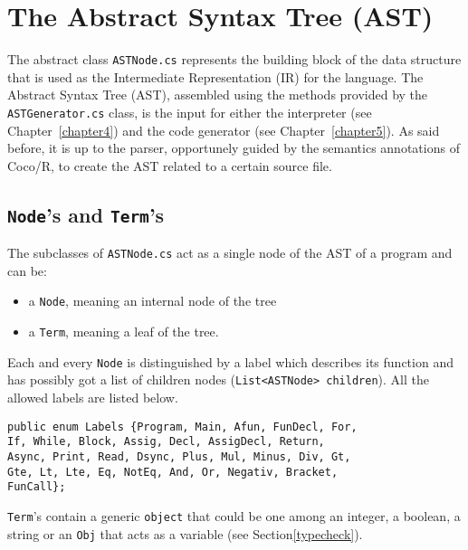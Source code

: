 \chapter{\label{chapter3} The Abstract Syntax Tree (AST)}

The abstract class \texttt{ASTNode.cs} represents the building block of the data structure that is used as the Intermediate Representation (IR) for the \fwap language. The Abstract Syntax Tree (AST), assembled using the methods provided by the \texttt{ASTGenerator.cs} class, is the input for either the interpreter (see Chapter~\ref{chapter4}) and the \fsharp code generator (see Chapter~\ref{chapter5}). As said before, it is up to the parser, opportunely guided by the semantics annotations of Coco/R, to create the AST related to a certain \fwap source file.

\section{\texttt{Node}'s and \texttt{Term}'s}

The subclasses of \texttt{ASTNode.cs} act as a single node of the AST of a program and can be:
\begin{itemize}
	\item a \texttt{Node}, meaning an internal node of the tree 
	\item a \texttt{Term}, meaning a leaf of the tree.
\end{itemize}

Each and every \texttt{Node} is distinguished by a label which describes its function and has possibly got a list of children nodes (\texttt{List<ASTNode> children}). All the allowed labels are listed below.\\

\begin{lstlisting}[caption=Labels for \texttt{Node}'s.]
public enum Labels {Program, Main, Afun, FunDecl, For,
If, While, Block, Assig, Decl, AssigDecl, Return, 
Async, Print, Read, Dsync, Plus, Mul, Minus, Div, Gt,
Gte, Lt, Lte, Eq, NotEq, And, Or, Negativ, Bracket, 
FunCall};
\end{lstlisting}

\texttt{Term}'s contain a generic \texttt{object} that could be one among an integer, a boolean, a string or an \texttt{Obj} that acts as a variable (see Section\ref{typecheck}).